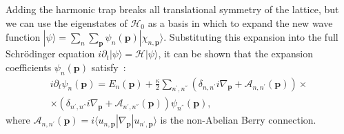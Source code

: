 \documentclass[twocolumn, 10pt, aps, superscriptaddress, floatfix, showpacs, pra, citeautoscript]{revtex4-1}
\newcommand{\vt}[1]{\mathbf{#1}}
\newcommand{\bra}[1]{\langle #1|}
\newcommand{\ket}[1]{|#1\rangle}
\begin{document}
Adding the harmonic trap breaks all translational symmetry of the lattice, but we can use the eigenstates of $\mathcal{H}_0$ as a basis in which to expand the new wave function 
$\ket{\psi} = \sum_n\sum_{\vt{p}} \psi_n(\vt{p})
\ket{\chi_{n,\vt{p}}}$. Substituting this expansion into the full Schr\"{o}dinger equation
$i \partial_t \ket{\psi} = \mathcal{H} \ket{\psi}$, it can be shown that the expansion coefficients $\psi_n(\vt{p})$ satisfy~\cite{price2014magnetic}:
%
\begin{multline} 
  i \partial_t \psi_n(\vt{p}) = E_n(\vt{p}) + \frac{\kappa}{2}\sum_{n^{'},n^{''}}\left(\delta_{n,n^{'}}i \nabla_{\vt{p}} + \mathcal{A}_{n,n^{'}}(\vt{p})\right)\times \\ \times \left(\delta_{n^{'},n^{''}}i\nabla_{\vt{p}} + \mathcal{A}_{n^{'},n^{''}}(\vt{p})\right) \psi_{n^{''}}(\vt{p}) ,  \label{eq:first}
\end{multline}
where $\mathcal{A}_{n,n^{'}}(\vt{p}) = i\bra{u_{n,\vt{p}}}\nabla_{\vt{p}}\ket{u_{n^{'},\vt{p}}}$ is the non-Abelian Berry connection. 
\end{document}
